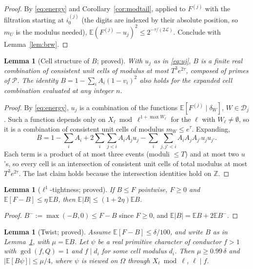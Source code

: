 \documentclass[11pt,reqno]{amsart}
\newtheorem{lemma}[theorem]{Lemma}
\theoremstyle{definition}
\newcommand{\cP}{\mathcal P}
\newcommand{\Lc}{\mathcal L}
\newcommand{\E}{\mathbb E}
\newcommand{\cD}{\mathcal D}
\begin{document}
\begin{proof}
By \eqref{eq:energy} and Corollary~\ref{cor:modtail}, applied to $F^{(j)}$ with
the filtration starting at $i_0^{(j)}$ (the digits are indexed by their
absolute position, so $m_U$ is the modulus needed),
$\E(F^{(j)}-u_j)^2\le2^{-\tau/(2\Lc)}$.  Conclude with Lemma~\ref{lem:brw}.
\end{proof}

\begin{lemma}[Cell structure of $B$; proved]\label{lem:size}
With $u_j$ as in \eqref{eq:uj}, $B$ is a finite real combination of consistent
unit cells of modulus at most $T^3e^{2\tau}$, composed of primes of $\cP$.
The identity $B=1-\sum_iA_i(1-v_i)^2$ also holds for the expanded cell
combination evaluated at any integer $n$.
\end{lemma}

\begin{proof}
By \eqref{eq:energy}, $u_j$ is a combination of the functions
$\E[F^{(j)}\mid\delta_W]$, $W\in\cD_j$.  Such a function depends only on
$X_\ell\bmod\ell^{1+\max W_\ell}$ for the $\ell$ with $W_\ell\ne\emptyset$, so it is a combination
of consistent unit cells of modulus $m_W\le e^\tau$.  Expanding,
\[
 B=1-\sum_iA_i+2\sum_i\sum_{j<i}A_iA_ju_j-\sum_i\sum_{j,j'<i}A_iA_jA_{j'}u_ju_{j'} .
\]
Each term is a product of at most three events (moduli $\le T$) and at most
two $u$'s, so every cell is an intersection of consistent unit cells of total
modulus at most $T^3e^{2\tau}$.  The last claim holds because the
intersection identities hold on $\mathbb Z$.
\end{proof}

\begin{lemma}[$\ell^1$-tightness; proved]\label{lem:l1}
If $B\le F$ pointwise, $F\ge0$ and $\E[F-B]\le\eta\,\E B$, then
$\E|B|\le(1+2\eta)\E B$.
\end{lemma}

\begin{proof}
$B^-:=\max(-B,0)\le F-B$ since $F\ge0$, and $\E|B|=\E B+2\E B^-$.
\end{proof}

\begin{lemma}[Twist; proved]\label{lem:twist}
Assume $\E[F-B]\le\delta/100$, and write $B$ as in Lemma~\ref{lem:size}, with
$\mu=\E B$.  Let $\psi$ be a real primitive character of conductor $f>1$ with
$\gcd(f,Q)=1$ and $f\mid d_i$ for some cell modulus $d_i$.  Then $\mu\ge0.99\,\delta$
and $|\E[B\psi]|\le\mu/4$, where $\psi$ is viewed on $\Omega$ through
$X_\ell\bmod\ell$, $\ell\mid f$.
\end{lemma}
\end{document}
